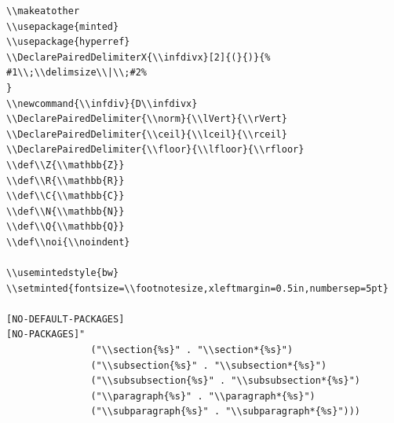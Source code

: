 \documentclass[10pt]{article}
\newcommand{\infdiv}{D\infdivx}
\DeclarePairedDelimiter{\norm}{\lVert}{\rVert}
\DeclarePairedDelimiter{\ceil}{\lceil}{\rceil}
\DeclarePairedDelimiter{\floor}{\lfloor}{\rfloor}
\def\Z{\mathbb{Z}}
\def\R{\mathbb{R}}
\def\C{\mathbb{C}}
\def\N{\mathbb{N}}
\def\Q{\mathbb{Q}}
\def\noi{\noindent}
\begin{document}
\begin{verbatim}
\\makeatother
\\usepackage{minted}
\\usepackage{hyperref}
\\DeclarePairedDelimiterX{\\infdivx}[2]{(}{)}{%
#1\\;\\delimsize\\|\\;#2%
}
\\newcommand{\\infdiv}{D\\infdivx}
\\DeclarePairedDelimiter{\\norm}{\\lVert}{\\rVert}
\\DeclarePairedDelimiter{\\ceil}{\\lceil}{\\rceil}
\\DeclarePairedDelimiter{\\floor}{\\lfloor}{\\rfloor}
\\def\\Z{\\mathbb{Z}}
\\def\\R{\\mathbb{R}}
\\def\\C{\\mathbb{C}}
\\def\\N{\\mathbb{N}}
\\def\\Q{\\mathbb{Q}}
\\def\\noi{\\noindent}

\\usemintedstyle{bw}
\\setminted{fontsize=\\footnotesize,xleftmargin=0.5in,numbersep=5pt}

[NO-DEFAULT-PACKAGES]
[NO-PACKAGES]"
               ("\\section{%s}" . "\\section*{%s}")
               ("\\subsection{%s}" . "\\subsection*{%s}")
               ("\\subsubsection{%s}" . "\\subsubsection*{%s}")
               ("\\paragraph{%s}" . "\\paragraph*{%s}")
               ("\\subparagraph{%s}" . "\\subparagraph*{%s}")))
\end{verbatim}
\end{document}
